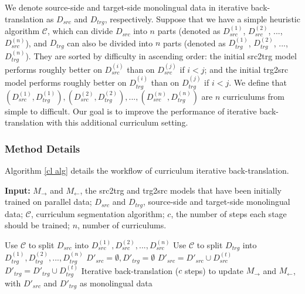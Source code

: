 \documentclass[letterpaper]{article} %
\begin{document}
We denote source-side and target-side monolingual data in iterative back-translation as $D_{src}$ and $D_{trg}$, respectively.
Suppose that we have a simple heuristic algorithm $\mathcal{C}$, which can divide $D_{src}$ into $n$ parts (denoted as $D_{src}^{(1)}$, $D_{src}^{(2)}$, ..., $D_{src}^{(n)}$), and $D_{trg}$ can also be divided into $n$ parts (denoted as $D_{trg}^{(1)}$, $D_{trg}^{(2)}$, ..., $D_{trg}^{(n)}$).
They are sorted by difficulty in ascending order:
the initial src2trg model performs roughly better on $D_{src}^{(i)}$ than on $D_{src}^{(j)}$ if $i<j$;
and the initial trg2src model performs roughly better on $D_{trg}^{(i)}$ than on $D_{trg}^{(j)}$ if $i<j$.
We define that $(D_{src}^{(1)}, D_{trg}^{(1)}), (D_{src}^{(2)}, D_{trg}^{(2)}), ..., (D_{src}^{(n)}, D_{trg}^{(n)})$ are $n$ curriculums from simple to difficult.
Our goal is to improve the performance of iterative back-translation with this additional curriculum setting.

\subsubsection{Method Details}

Algorithm \ref{cl alg} details the workflow of curriculum iterative back-translation.

\begin{algorithm}[!h]
\small
	\caption{Curriculum Iterative Back-Translation}
	\label{cl alg}
	\textbf{Input:} $M_{\rightarrow}$ and $M_{\leftarrow}$, the src2trg and trg2src models that have been initially trained on parallel data; $D_{src}$ and $D_{trg}$, source-side and target-side monolingual data; $\mathcal{C}$, curriculum segmentation algorithm; $c$, the number of steps each stage should be trained; $n$, number of curriculums.
	\begin{algorithmic}[1]
		\State Use $\mathcal{C}$ to split $D_{src}$ into $D^{(1)}_{src}, D^{(2)}_{src}, ..., D^{(n)}_{src}$
		\State Use $\mathcal{C}$ to split $D_{trg}$ into $D^{(1)}_{trg}, D^{(2)}_{trg}, ..., D^{(n)}_{trg}$
		\State $D'_{src}=\emptyset, D'_{trg}=\emptyset$
		 
		\State $D'_{src} = D'_{src} \cup D^{(t)}_{src}$
		\State $D'_{trg} = D'_{trg} \cup D^{(t)}_{trg}$
		\State Iterative back-translation ($c$ steps) to update $M_{\rightarrow}$ and $M_{\leftarrow}$, with $D'_{src}$ and $D'_{trg}$ as monolingual data
		\EndFor
	\end{algorithmic}
\end{algorithm}
\end{document}
